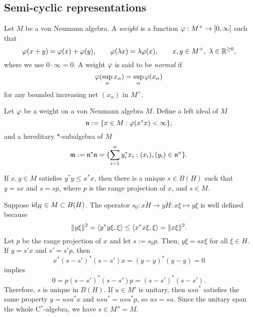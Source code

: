 \documentclass{../../../small}
\begin{document}
\subsection{Semi-cyclic representations}


\begin{defn}[Weights]
Let $M$ be a von Neumann algebra.
A \emph{weight} is a function $\varphi:M^+\to[0,\infty]$ such that
\[\varphi(x+y)=\varphi(x)+\varphi(y),\qquad\varphi(\lambda x)=\lambda\varphi(x),\qquad x,y\in M^+,\ \lambda\in\mathbb{R}^{\ge0},\]
where we use $0\cdot\infty=0$.
A weight $\varphi$ is said to be \emph{normal} if
\[\varphi(\sup_\alpha x_\alpha)=\sup_\alpha\varphi(x_\alpha)\]
for any bounded increasing net $(x_\alpha)$ in $M^+$.
\end{defn}
\begin{defn}
Let $\varphi$ be a weight on a von Neumann algebra $M$.
Define a left ideal of $M$
\[\mathfrak{n}:=\{x\in M:\varphi(x^*x)<\infty\},\]
and a hereditary $*$-subalgebra of $M$
\[\mathfrak{m}:=\mathfrak{n}^*\mathfrak{n}=\{\sum_{i=1}^ny_i^*x_i:(x_i),(y_i)\in\mathfrak{n}^n\}.\]
\end{defn}


\begin{lem}
If $x,y\in M$ satisfies $y^*y\le x^*x$, then there is a unique $s\in B(H)$ such that $y=sx$ and $s=sp$, where $p$ is the range projection of $x$, and $s\in M$.
\end{lem}
\begin{pf}
Suppose $\operatorname{id}_H\in M\subset B(H)$.
The operator $s_0:\bar{xH}\to\bar{yH}:x\xi\mapsto y\xi$ is well defined because
\[\|y\xi\|^2=\langle y^*y\xi,\xi\rangle\le\langle x^*x\xi,\xi\rangle=\|x\xi\|^2.\]
Let $p$ be the range projection of $x$ and let $s:=s_0p$.
Then, $y\xi=sx\xi$ for all $\xi\in H$.
If $y=s'x$ and $s'=s'p$, then
\[x^*(s-s')^*(s-s')x=(y-y)^*(y-y)=0\]
implies
\[0=p(s-s')^*(s-s')p=(s-s')^*(s-s').\]
Therefore, $s$ is unique in $B(H)$.
If $u\in M'$ is unitary, then $usu^*$ satisfies the same property $y=usu^*x$ and $usu^*=usu^*p$, so $us=su$.
Since the unitary span the whole C$^*$-algebra, we have $s\in M''=M$.
\end{pf}
\end{document}
